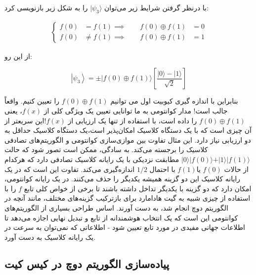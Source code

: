 \documentclass{book}
\begin{document}
با درنظر گرفتن شرایط زیر می‌توان $\vert\psi_{3}\rangle$ را به شکل زیر بازنویسی کرد:
\begin{center}
\begin{equation}\label{constantorbalanse}
	\begin{aligned}
		\left\{
		\begin{aligned}
			f(0) &= f(1) 
			\implies \qquad f(0) \oplus f(1) &= 0\\
			f(0) &\neq f(1) 
			\implies \qquad f(0) \oplus f(1) &= 1
		\end{aligned}
		\right.
	\end{aligned}
\end{equation}
\end{center}
از این رو:
\begin{center}
	\begin{equation}\label{psi3 deutsch algorithm}
	\left|\psi_3\right\rangle= \pm|f(0) \oplus f(1)\rangle\left[\frac{|0\rangle-|1\rangle}{\sqrt{2}}\right]	
	\end{equation}
\end{center}
بنابراین با اندازه گیری کیوبیت اول می توانیم $f(0) \oplus f(1)$ را تعیین کنیم. واقعاً جالب است! مدار کوانتومی به ما توانایی تعیین یک ویژگی کلی از $f(x)$، یعنی$ f(0)\oplus f(1)$ را داده است، با استفاده از تنها یک ارزیابی از $f(x)$!این سریعتر از آن چیزی است که با یک دستگاه کلاسیک امکان‌پذیر است،یک دستگاه کلاسیک حداقل به دو ارزیابی نیاز دارد.
این مثال تفاوت بین موازی‌سازی کوانتومی و الگوریتم‌های تصادفی کلاسیک را برجسته می‌کند. به سادگی، ممکن است تصور شود که حالت $\vert0\rangle \vert f(0) \rangle + \vert1\rangle \vert f(1) \rangle$ مطابقت نزدیکی با یک رایانه کلاسیک تصادفی دارد که هرکدام از حالات $ f (0)$ یا$ f (1) $ با احتمال $1/2$ اندازه‌گیری می‌کند.
تفاوت این است که در یک رایانه کلاسیک این دو گزینه همیشه یکدیگر را حذف می‌کنند. در یک رایانه کوانتومی، امکان دارد که دو گزینه با یکدیگر تداخل داشته باشند تا برخی از خواص کلی تابع $f$ را با استفاده از چیزی شبیه به گیت هادامارد برای بازترکیب گزینه‌های مختلف، مانند آنچه در الگوریتم دوچ انجام شد، به دست آورند.
اساس طراحی بسیاری از الگوریتم‌های کوانتومی این است که یک انتخاب هوشمندانه از تابع و تبدیل نهایی اجازه می‌دهد تا اطلاعات جهانی مفیدی در مورد تابع تعیین شود - اطلاعاتی که نمی‌توان به سرعت در یک رایانه کلاسیک به دست آورد.



\subsection{پیاده‌سازی الگوریتم دوچ در کیس کیت}
\end{document}
